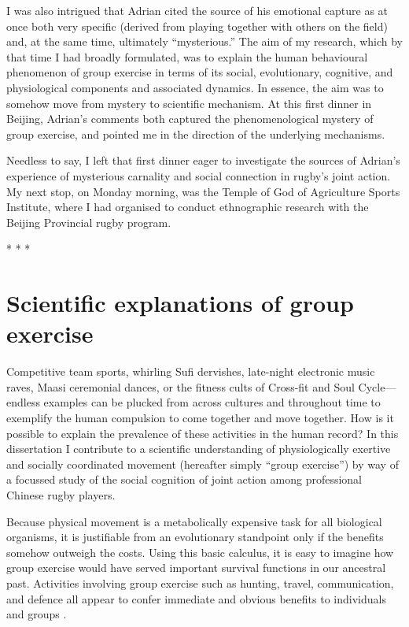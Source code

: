 \begin{CJK}{UTF8}{gbsn}
I was also intrigued that Adrian cited the source of his emotional capture as at once both very specific (derived from playing together with others on the field) and, at the same time, ultimately ``mysterious.''  The aim of my research, which by that time I had broadly formulated, was to explain the human behavioural phenomenon of group exercise in terms of its social, evolutionary, cognitive, and physiological components and associated dynamics.  In essence, the aim was to somehow move from mystery to scientific mechanism.  At this first dinner in Beijing, Adrian's comments both captured the phenomenological mystery of group exercise, and pointed me in the direction of the underlying mechanisms.

Needless to say, I left that first dinner eager to investigate the sources of Adrian's experience of mysterious carnality and social connection in rugby's joint action.  My next stop, on Monday morning, was the Temple of God of Agriculture Sports Institute, where I had organised to conduct ethnographic research with the Beijing Provincial rugby program.


                            \begin{center}
                              * * *
                            \end{center}





\section{Scientific explanations of group exercise}
Competitive team sports, whirling Sufi dervishes, late-night electronic music raves, Maasi ceremonial dances, or the fitness cults of Cross-fit and Soul Cycle---endless examples can be plucked from across cultures and throughout time to exemplify the human compulsion to come together and move together.  How is it possible to explain the prevalence of these activities in the human record?  In this dissertation I contribute to a scientific understanding of physiologically exertive and socially coordinated movement (hereafter simply ``group exercise'') by way of a focussed study of the social cognition of joint action among professional Chinese rugby players.

Because physical movement is a metabolically expensive task for all biological organisms, it is justifiable from an evolutionary standpoint only if the benefits somehow outweigh the costs.  Using this basic calculus, it is easy to imagine how group exercise would have served important survival functions in our ancestral past.  Activities involving group exercise such as hunting, travel, communication, and defence all appear to confer immediate and obvious benefits to individuals and groups \citep{Sands2010}.


\end{CJK}
